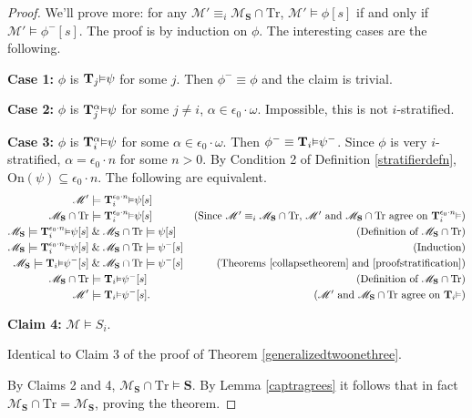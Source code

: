 \documentclass[reqno]{article}
\theoremstyle{definition}
\def\M{\mathscr{M}}
\def\T{\mathbf{T}}
\def\S{\mathbf{S}}
\def\epom{\epsilon_0\cdot\omega}
\def\onset{\mathrm{On}}
\def\Tr{\mathrm{Tr}}
\def\ctr{\cap\Tr}
\def\myequiv{\equiv}
\renewcommand{\Pr}[1]{\T_{#1}\mbox{\small${\vDash}$}}
\newcommand{\Prr}[2]{\T^{#1}_{#2}\mbox{\small${\vDash}$}}
\newcommand{\case}[1]{\textbf{Case #1:}}
\newcommand{\claim}[1]{\textbf{Claim #1:}}
\begin{document}
\begin{proof}
\item
We'll prove more: for any $\M'\myequiv_i \M_\S\ctr$, $\M'\models\phi[s]$ if and only if $\M'\models\phi^-[s]$.
The proof is by induction on $\phi$.  The interesting cases are the following.

\item
\case1
$\phi$ is $\Pr j\psi$ for some $j$.  Then $\phi^-\equiv \phi$ and the claim is trivial.

\item\case2
$\phi$ is $\Prr\alpha j\psi$ for some $j\not=i$, $\alpha\in\epom$.  Impossible, this is not $i$-stratified.

\item\case3
$\phi$ is $\Prr\alpha i\psi$ for some $\alpha\in\epom$.
Then $\phi^-\equiv\Pr i\psi^-$.
Since $\phi$ is very $i$-stratified, $\alpha=\epsilon_0\cdot n$ for some $n>0$.
By Condition 2 of Definition \ref{stratifierdefn}, $\onset(\psi)\subseteq \epsilon_0\cdot n$.
The following are equivalent.
\begin{align*}
\M' &\models \Prr{\epsilon_0\cdot n}i\psi[s]\\
\M_\S\ctr &\models \Prr{\epsilon_0\cdot n}i\psi[s]
  &\mbox{(Since $\M'\myequiv_i\M_\S\ctr$, $\M'$ and $\M_\S\ctr$ agree on $\Prr{\epsilon_0\cdot n}i$)}\\
\M_\S\models \Prr{\epsilon_0\cdot n}i\psi[s] &\mathrel\& \M_\S\ctr\models\psi[s]
  &\mbox{(Definition of $\M_\S\ctr$)}\\
\M_\S\models \Prr{\epsilon_0\cdot n}i\psi[s] &\mathrel\& \M_\S\ctr\models\psi^-[s]
  &\mbox{(Induction)}\\
\M_\S\models \Pr i\psi^-[s] &\mathrel\& \M_\S\ctr\models\psi^-[s]
  &\mbox{(Theorems \ref{collapsetheorem} and \ref{proofstratification})}\\
\M_\S\ctr &\models \Pr i\psi^-[s]
  &\mbox{(Definition of $\M_\S\ctr$)}\\
\M' &\models \Pr i\psi^-[s].
  &\mbox{($\M'$ and $\M_\S\ctr$ agree on $\Pr i$)}
\end{align*}

\item
\claim4
$\M\models S_i$.

\item
Identical to Claim 3 of the proof of Theorem \ref{generalizedtwoonethree}.

\item
By Claims 2 and 4, $\M_\S\ctr\models \S$.
By Lemma \ref{captragrees} it follows that in fact $\M_\S\ctr=\M_\S$, proving the theorem.
\end{proof}
\end{document}
